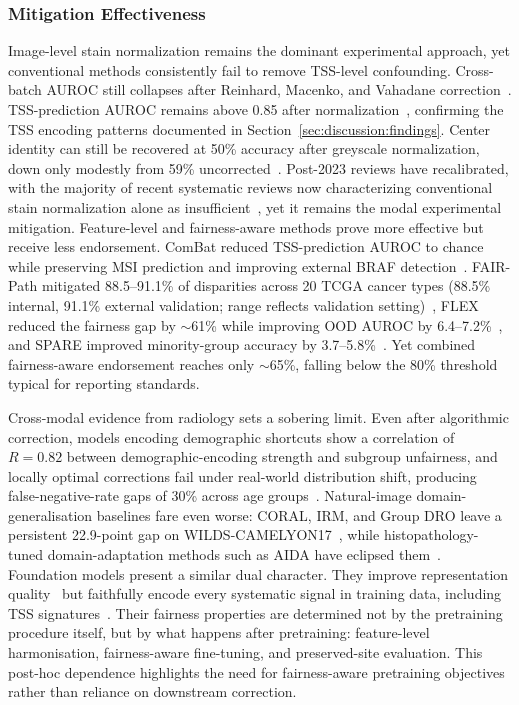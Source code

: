 \subsubsection{Mitigation Effectiveness}
\label{sec:discussion:effectiveness}
Image-level stain normalization remains the dominant experimental approach, yet conventional methods consistently fail to remove TSS-level confounding. Cross-batch AUROC still collapses after Reinhard, Macenko, and Vahadane correction~\citep{komen2024batch}. TSS-prediction AUROC remains above 0.85 after normalization~\citep{howard2021site}, confirming the TSS encoding patterns documented in Section~\ref{sec:discussion:findings}. Center identity can still be recovered at 50\% accuracy after greyscale normalization, down only modestly from 59\% uncorrected~\citep{kheiri2025investigation}. Post-2023 reviews have recalibrated, with the majority of recent systematic reviews now characterizing conventional stain normalization alone as insufficient~\citep{montezuma2025unbiased, chinta2025aidriven}, yet it remains the modal experimental mitigation. Feature-level and fairness-aware methods prove more effective but receive less endorsement. ComBat reduced TSS-prediction AUROC to chance while preserving MSI prediction and improving external BRAF detection~\citep{murchan2024combat}. FAIR-Path mitigated 88.5--91.1\% of disparities across 20 TCGA cancer types (88.5\% internal, 91.1\% external validation; range reflects validation setting)~\citep{lin2025contrastive}, FLEX reduced the fairness gap by $\sim$61\% while improving OOD AUROC by 6.4--7.2\%~\citep{huang2025knowledge}, and SPARE improved minority-group accuracy by 3.7--5.8\%~\citep{xu2026spare}. Yet combined fairness-aware endorsement reaches only $\sim$65\%, falling below the 80\% threshold typical for reporting standards.

Cross-modal evidence from radiology sets a sobering limit. Even after algorithmic correction, models encoding demographic shortcuts show a correlation of $R{=}0.82$ between demographic-encoding strength and subgroup unfairness, and locally optimal corrections fail under real-world distribution shift, producing false-negative-rate gaps of 30\% across age groups~\citep{yang2024limits}. Natural-image domain-generalisation baselines fare even worse: CORAL, IRM, and Group DRO leave a persistent 22.9-point gap on WILDS-CAMELYON17~\citep{koh2021wilds}, while histopathology-tuned domain-adaptation methods such as AIDA have eclipsed them~\citep{asadiaghbolagh2024learning}. Foundation models present a similar dual character. They improve representation quality~\citep{ciga2023self, huang2025knowledge} but faithfully encode every systematic signal in training data, including TSS signatures~\citep{komen2024batch, dehkharghanian2023biased, sikaroudi2023generalization}. Their fairness properties are determined not by the pretraining procedure itself, but by what happens after pretraining: feature-level harmonisation, fairness-aware fine-tuning, and preserved-site evaluation. This post-hoc dependence highlights the need for fairness-aware pretraining objectives rather than reliance on downstream correction.

